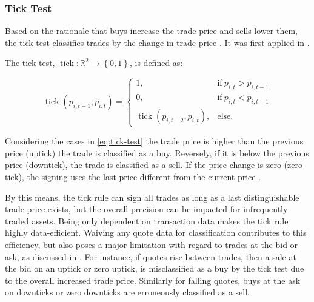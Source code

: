 \subsubsection{Tick Test}\label{sec:tick-test}

Based on the rationale that buys increase the trade price and sells lower them, the tick test classifies trades by the change in trade price \autocite[][271]{easleyDiscerningInformationTrade2016}. It was first applied in \textcites[][244]{holthausenEffectLargeBlock1987}[][240]{hasbrouckTradesQuotesInventories1988}.

The tick test, $\operatorname{tick}\colon \mathbb{R}^2 \to \left\{0,1\right\}$, is defined as:

\begin{equation}
  \operatorname{tick}(p_{i, t-1}, p_{i,t})=
  \begin{cases}
    1,                                         & \text{if}\ p_{i, t} > p_{i, t-1} \\
    0,                                         & \text{if}\ p_{i, t} < p_{i, t-1} \\
    \operatorname{tick}(p_{i,t-2}, p_{i,t}), & \text{else}.
  \end{cases}
  \label{eq:tick-test}
\end{equation}


Considering the cases in \cref{eq:tick-test} the trade price is higher than the previous price (uptick) the trade is classified as a buy. Reversely, if it is below the previous price (downtick), the trade is classified as a sell. If the price change is zero (zero tick), the signing uses the last price different from the current price \autocite[][3]{leeInferringTradeDirection1991}.

By this means, the tick rule can sign all trades as long as a last distinguishable trade price exists, but the overall precision can be impacted for infrequently traded assets. Being only dependent on transaction data makes the tick rule highly data-efficient. Waiving any quote data for classification contributes to this efficiency, but also poses a major limitation with regard to trades at the bid or ask, as discussed in \textcite[][557--558]{finucaneDirectTestMethods2000}. For instance, if quotes rise between trades, then a sale at the bid on an uptick or zero uptick, is misclassified as a buy by the tick test due to the overall increased trade price. Similarly for falling quotes, buys at the ask on downticks or zero downticks are erroneously classified as a sell.

